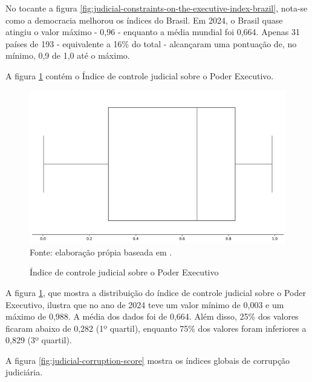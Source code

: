 No tocante a figura \ref{fig:judicial-constraints-on-the-executive-index-brazil}, nota-se como a democracia melhorou os índices do Brasil. Em 2024, o Brasil quase atingiu o valor máximo - 0,96 - enquanto a média mundial foi 0,664. Apenas 31 países de 193 - equivalente a 16\% do total - alcançaram uma pontuação de, no mínimo, 0,9 de 1,0 até o máximo.

A figura \ref{fig:quartis_controle_jus_sobre_gov} contém o Índice de controle judicial sobre o Poder Executivo.

\begin{figure}[H]
    \centering
    \caption{Índice de controle judicial sobre o Poder Executivo}
    \includegraphics[width=1\linewidth]{figuras/quartis_controle_jus_sobre_gov.png}
    \label{fig:quartis_controle_jus_sobre_gov}
    \footnotesize{Fonte: elaboração própia baseada em \cite{jus_constraints_on_gov}.}
\end{figure}

A figura \ref{fig:quartis_controle_jus_sobre_gov}, que mostra a distribuição do índice de controle judicial sobre o Poder Executivo, ilustra que no ano de 2024 teve um valor mínimo de 0,003 e um máximo de 0,988. A média dos dados foi de 0,664. Além disso, 25\% dos valores ficaram abaixo de 0,282 (1º quartil), enquanto 75\% dos valores foram inferiores a 0,829 (3º quartil).

A figura \ref{fig:judicial-corruption-score} mostra os índices globais de corrupção judiciária.

